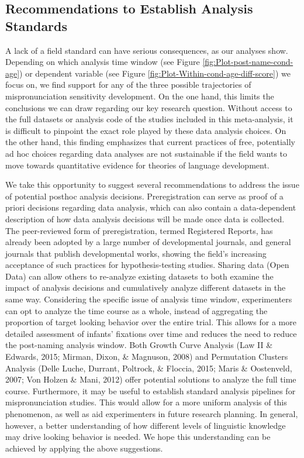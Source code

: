 \documentclass[man]{apa6}
\begin{document}
\hypertarget{recommendations-to-establish-analysis-standards}{%
\subsection{Recommendations to Establish Analysis Standards}\label{recommendations-to-establish-analysis-standards}}

A lack of a field standard can have serious consequences, as our analyses show. Depending on which analysis time window (see Figure \ref{fig:Plot-post-name-cond-age}) or dependent variable (see Figure \ref{fig:Plot-Within-cond-age-diff-score}) we focus on, we find support for any of the three possible trajectories of mispronunciation sensitivity development. On the one hand, this limits the conclusions we can draw regarding our key research question. Without access to the full datasets or analysis code of the studies included in this meta-analysis, it is difficult to pinpoint the exact role played by these data analysis choices. On the other hand, this finding emphasizes that current practices of free, potentially ad hoc choices regarding data analyses are not sustainable if the field wants to move towards quantitative evidence for theories of language development.

We take this opportunity to suggest several recommendations to address the issue of potential posthoc analysis decisions. Preregistration can serve as proof of a priori decisions regarding data analysis, which can also contain a data-dependent description of how data analysis decisions will be made once data is collected. The peer-reviewed form of preregistration, termed Registered Reports, has already been adopted by a large number of developmental journals, and general journals that publish developmental works, showing the field's increasing acceptance of such practices for hypothesis-testing studies. Sharing data (Open Data) can allow others to re-analyze existing datasets to both examine the impact of analysis decisions and cumulatively analyze different datasets in the same way. Considering the specific issue of analysis time window, experimenters can opt to analyze the time course as a whole, instead of aggregating the proportion of target looking behavior over the entire trial. This allows for a more detailed assessment of infants' fixations over time and reduces the need to reduce the post-naming analysis window. Both Growth Curve Analysis (Law II \& Edwards, 2015; Mirman, Dixon, \& Magnuson, 2008) and Permutation Clusters Analysis (Delle Luche, Durrant, Poltrock, \& Floccia, 2015; Maris \& Oostenveld, 2007; Von Holzen \& Mani, 2012) offer potential solutions to analyze the full time course. Furthermore, it may be useful to establish standard analysis pipelines for mispronunciation studies. This would allow for a more uniform analysis of this phenomenon, as well as aid experimenters in future research planning. In general, however, a better understanding of how different levels of linguistic knowledge may drive looking behavior is needed. We hope this understanding can be achieved by applying the above suggestions.
\end{document}
